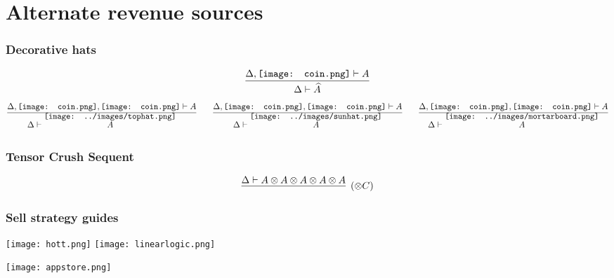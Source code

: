 \documentclass{beamer}
\newcommand{\coin}{\texttt{[image: coin.png]}}
\newcommand{\tophat}[1]{\ensuremath{\overset{\raisebox{-1.4em}[-1em]{\texttt{[image: ../images/tophat.png]}}}{#1}}}
\newcommand{\sunhat}[1]{\ensuremath{\overset{\raisebox{-1.4em}[-1em]{\texttt{[image: ../images/sunhat.png]}}}{#1}}}
\newcommand{\gradhat}[1]{\ensuremath{\overset{\raisebox{-1.4em}[-1em]{\texttt{[image: ../images/mortarboard.png]}}}{#1}}}
\begin{document}
\section{Alternate revenue sources}

\begin{frame}
\frametitle{Decorative hats}
\[\infer
  {\Delta\vdash\widehat{A}}
  {\Delta,\coin\vdash A}
\]
\pause
\[\infer
  {\Delta\vdash\tophat{A}}
  {\Delta,\coin,\coin\vdash A}
\qquad
  \infer
  {\Delta\vdash\sunhat{A}}
  {\Delta,\coin,\coin\vdash A}
\qquad
  \infer
  {\Delta\vdash\gradhat{A}}
  {\Delta,\coin,\coin\vdash A}
\]
\end{frame}

\begin{frame}
\frametitle{Tensor Crush Sequent}
\[\infer[(\otimes C)]
  {\ }
  {\Delta\vdash A\otimes A\otimes A\otimes A\otimes A}
\]
\end{frame}

\begin{frame}
\frametitle{Sell strategy guides}
\texttt{[image: hott.png]}\qquad
\texttt{[image: linearlogic.png]}
\end{frame}

\begin{frame}
\begin{center}
\texttt{[image: appstore.png]}
\end{center}
\end{frame}
\end{document}
